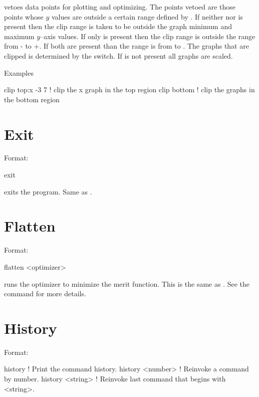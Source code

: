 \vskip 0.2in  vetoes data points for plotting and
optimizing. The points vetoed are those points whose $y$ values are
outside a certain range defined by  . If
neither  nor  is present then the clip range
is taken to be outside the graph minimum and maximum $y$--axis
values. If only  is present then the clip range is
outside the range from - to +. If both are
present than the range is from  to .  The
graphs that are clipped is determined by the  switch.  If
 is not present all graphs are scaled.

Examples
\begin{example}
  clip top:x -3  7  ! clip the x graph in the top region
  clip bottom       ! clip the graphs in the bottom region
\end{example}

\section{Exit}
\label{s:exit}

Format:
\begin{example}
  exit
\end{example}

\vskip 0.2in
 exits the program. Same as .

\section{Flatten}
\label{s:flatten}

Format:
\begin{example}
  flatten <optimizer>
\end{example}

\vskip 0.2in
 runs the optimizer to minimize the merit function. This is the 
same as . See the  command for more details.

\section{History}
\label{s:history}

Format:
\begin{example}
  history           ! Print the command history.
  history <number>  ! Reinvoke a command by number.
  history <string>  ! Reinvoke last command that begins with <string>.
\end{example}

